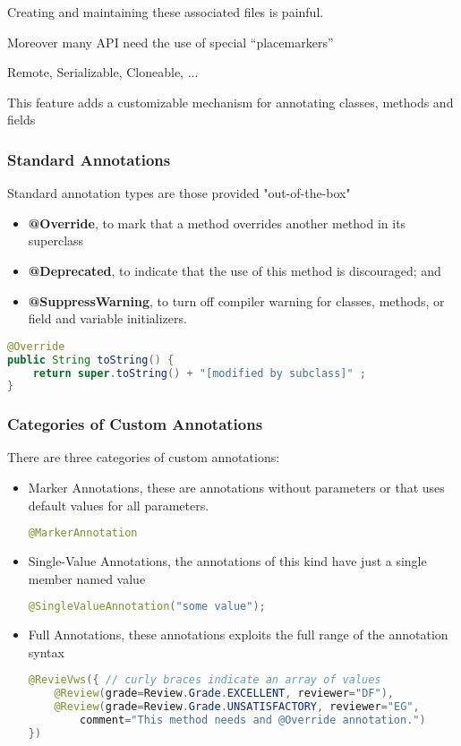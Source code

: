 Creating and maintaining these associated files is painful.

Moreover many API need the use of special “placemarkers” 

Remote, Serializable, Cloneable, ... 

This feature adds a customizable mechanism for annotating classes, methods and fields

\subsubsection{Standard Annotations}

Standard annotation types are those provided "out-of-the-box"

\begin{itemize}
	\item \textbf{@Override}, to mark that a method overrides another method in its superclass
	\item \textbf{@Deprecated}, to indicate that the use of this method is discouraged; and
	\item \textbf{@SuppressWarning}, to turn off compiler warning for classes, methods, or field and variable initializers.
\end{itemize}

\begin{lstlisting}[language=Java]
@Override
public String toString() {
	return super.toString() + "[modified by subclass]" ;
}
\end{lstlisting}

\subsubsection{Categories of Custom Annotations}
There are three categories of custom annotations:
\begin{itemize}
	\item Marker Annotations, these are annotations without parameters or that uses default values for all parameters.
\begin{lstlisting}[language=Java]
@MarkerAnnotation
\end{lstlisting}	
	\item Single-Value Annotations, the annotations of this kind have just a single member named value
\begin{lstlisting}[language=Java]
@SingleValueAnnotation("some value");
\end{lstlisting}
	\item Full Annotations, these annotations exploits the full range of the annotation syntax
\begin{lstlisting}[language=Java]
@RevieVws({ // curly braces indicate an array of values
	@Review(grade=Review.Grade.EXCELLENT, reviewer="DF"),
	@Review(grade=Review.Grade.UNSATISFACTORY, reviewer="EG",
		comment="This method needs and @Override annotation.")
})
\end{lstlisting}
\end{itemize}

